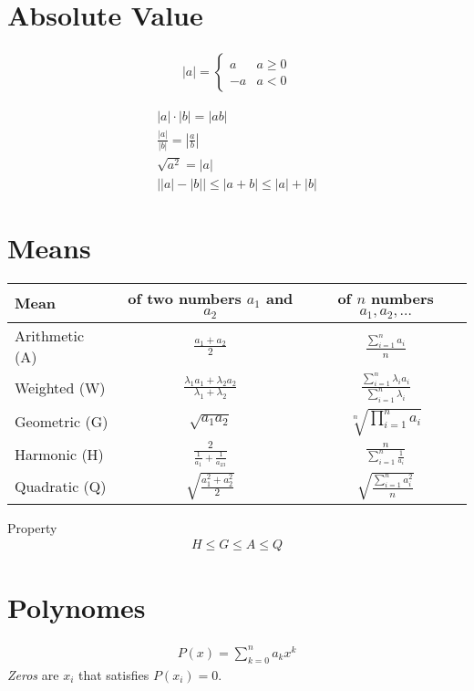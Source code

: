 \section{Absolute Value}
\begin{eqnarray}
	|a|=\begin{cases}
		a & a\geq0\\
		-a & a<0
	\end{cases}
\end{eqnarray}

\begin{eqnarray}
	|a|\cdot |b|=|ab|\\
	\frac{|a|}{|b|}=|\frac{a}{b}|\\
	\sqrt{a^2}=|a|\\
	\left ||a|-|b|\right |\leq |a+b|\leq |a| + |b|
\end{eqnarray}
\section{Means}
\begin{tabular}{|l|c|c|}
	\hline
	\textbf{Mean} & \textbf{of two numbers $a_1$ and $a_2$} & \textbf{of $n$ numbers $a_1, a_2,\dots$}\\
	\hline
	Arithmetic (A) & $\frac{a_1+a_2}{2}$ & $\frac{\sum_{i=1}^na_i}{n}$\\
	Weighted (W)& $\frac{\lambda_1a_1+\lambda_2a_2}{\lambda_1+\lambda_2}$ & $\frac{\sum_{i=1}^n\lambda_ia_i}{\sum_{i=1}^n\lambda_i}$\\
	Geometric (G)& $\sqrt{a_1a_2}$ & $\sqrt[n]{\prod_{i=1}^na_i}$\\
	Harmonic (H)& $\frac{2}{\frac{1}{a_1}+\frac{1}{a_23}}$ & $\frac{n}{{\sum_{i=1}^n\frac{1}{a_i}}}$\\
	Quadratic (Q)& $\sqrt{\frac{a_1^2+a_2^2}{2}}$ & $\sqrt{\frac{\sum_{i=1}^na_i^2}{n}}$\\
	\hline
\end{tabular}

Property
\begin{eqnarray}
	H\leq G\leq A\leq Q
\end{eqnarray}

\section{Polynomes}
\begin{eqnarray}
	P(x)=\sum_{k=0}^na_kx^k
\end{eqnarray}
\emph{Zeros} are $x_i$ that satisfies $P(x_i)=0$.
